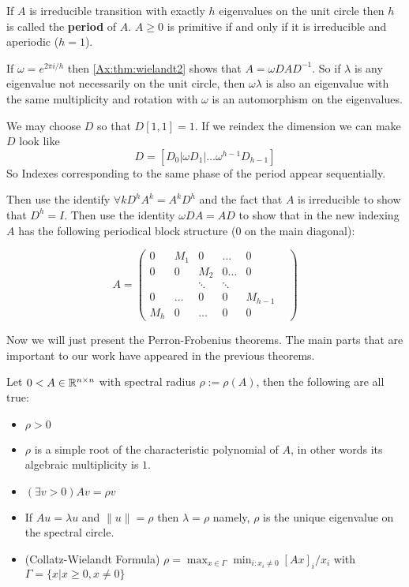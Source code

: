 \begin{remark}
\label{Ax:remark:wielandt_cyclicity}
If $A$ is irreducible transition with exactly $h$ 
eigenvalues on the unit circle then $h$ is called the \textbf{period} of $A$.
$A \geq 0$ is primitive if and only if it is irreducible and aperiodic ($h=1$).

If $\omega = e^{2 \pi i /h}$ then \ref{Ax:thm:wielandt2} shows that $A = \omega D A
D^{-1}$. So if $\lambda$ is any eigenvalue not necessarily on the unit circle,
then $\omega \lambda$ is also an eigenvalue with the same multiplicity and
rotation with $\omega$ is an automorphism on the eigenvalues.

We may choose $D$ so that $D[1,1]=1$. If we reindex the dimension we can make
$D$ look like 
\[
D = [D_0 | \omega D_1 | \dots \omega^{h-1} D_{h-1}]
\] So Indexes corresponding to the same phase of the period appear sequentially.


Then use the identify $\forall k D^hA^{k} = A^k D^h$ and the fact that $A$ is
irreducible to show that $D^h = I$. Then use the identity $\omega DA = AD$ to
show that in the new indexing $A$ has the following periodical block structure
($0$ on the main diagonal):

\[
A = 
\begin{pmatrix}
0 & M_1 & 0 & \dots & 0 \\
0 & 0 & M_2 & 0 \dots & 0 \\
 &  & \ddots & \ddots & &  \\
0 & \dots & 0 & 0 & M_{h-1} \\
M_h & 0 & \dots & 0 & 0 
\end{pmatrix}
\]
\end{remark}


Now we will just present the Perron-Frobenius theorems. The main parts that are
important to our work have appeared in the previous theorems.

\begin{thm}
\label{Ax:thm:perron1}


Let $0 < A \in \mathbb{R}^{n \times n}$ with spectral radius $\rho := \rho(A)$, then the following are all true:
\begin{itemize}
\item{} $\rho \gt 0$
\item{} $\rho$ is a simple root of the characteristic polynomial of $A$,
in other words its algebraic multiplicity is $1$.
\item{} $(\exists v > 0) Av=\rho v$
\item{} If $Au = \lambda u$ and $\|u\|= \rho$ then $\lambda = \rho$
namely, $\rho$ is the unique eigenvalue on the spectral circle.
\item{(Collatz-Wielandt Formula)} $\rho = \max_{x \in \Gamma} \min_{i : x_i \neq 0} [Ax]_i / x_i$
with $\Gamma = \{x | x \geq 0, x \neq 0\}$
\end{itemize}
\end{thm}

